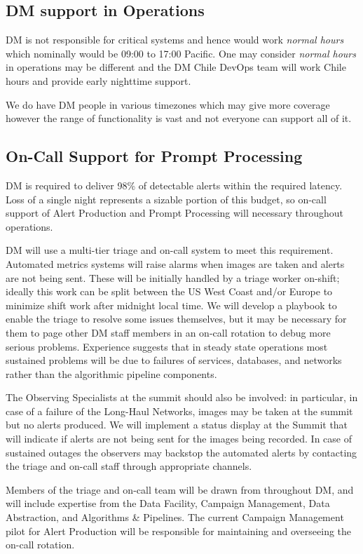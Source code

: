 \subsection{DM support in Operations} \label{sec:support}
DM is not responsible for critical systems and hence would work \emph{normal hours} which nominally would be 09:00 to 17:00 Pacific.
One may consider \emph{normal hours} in operations may be different and the DM Chile DevOps team will work Chile hours and provide early nighttime support.

We do have DM people in various timezones which may give more coverage however the range of functionality is vast and not everyone can support all of it.

\subsection{On-Call Support for Prompt Processing}

DM is required  to deliver 98\% of detectable alerts within the required latency.
Loss of a single night represents a sizable portion of this budget, so on-call support of Alert Production and Prompt Processing will necessary throughout operations.

DM will use a multi-tier triage and on-call system to meet this requirement.
Automated metrics systems will raise alarms when images are taken and alerts are not being sent.
These will be initially handled by a triage worker on-shift; ideally this work can be split between the US West Coast and/or Europe to minimize shift work after midnight local time.
We will develop a playbook to enable the triage to resolve some issues themselves, but it may be necessary for them to page other DM staff members in an on-call rotation to debug more serious problems.
Experience suggests that in steady state operations most sustained problems will be due to failures of services, databases, and networks rather than the algorithmic pipeline components.

The Observing Specialists at the summit should also be involved: in particular, in case of a failure of the Long-Haul Networks, images may be taken at the summit but no alerts produced.
We will implement a status display at the Summit that will indicate if alerts are not being sent for the images being recorded.
In case of sustained outages the observers may backstop the automated alerts by contacting the triage and on-call staff through appropriate channels.

Members of the triage and on-call team will be drawn from throughout DM, and will include expertise from the Data Facility, Campaign Management, Data Abstraction, and Algorithms \& Pipelines.
The current Campaign Management pilot for Alert Production will be responsible for maintaining and overseeing the on-call rotation.

